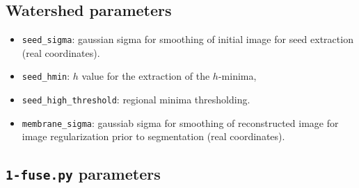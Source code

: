 \subsection{Watershed parameters}
\label{sec:cli:parameters:watershed}

\begin{itemize}
\itemsep -0.5ex
\item \texttt{seed\_sigma}:
  gaussian sigma for smoothing of initial image for seed extraction
  (real coordinates).
\item \texttt{seed\_hmin}:
  $h$ value for the extraction of the $h$-minima,
\item \texttt{seed\_high\_threshold}:
  regional minima thresholding. 
\item \texttt{membrane\_sigma}:
  gaussiab sigma for smoothing of reconstructed image for image 
  regularization prior to segmentation
  (real coordinates).
\end{itemize}










\subsection{\texttt{1-fuse.py} parameters}
\label{sec:cli:parameters:fuse}


